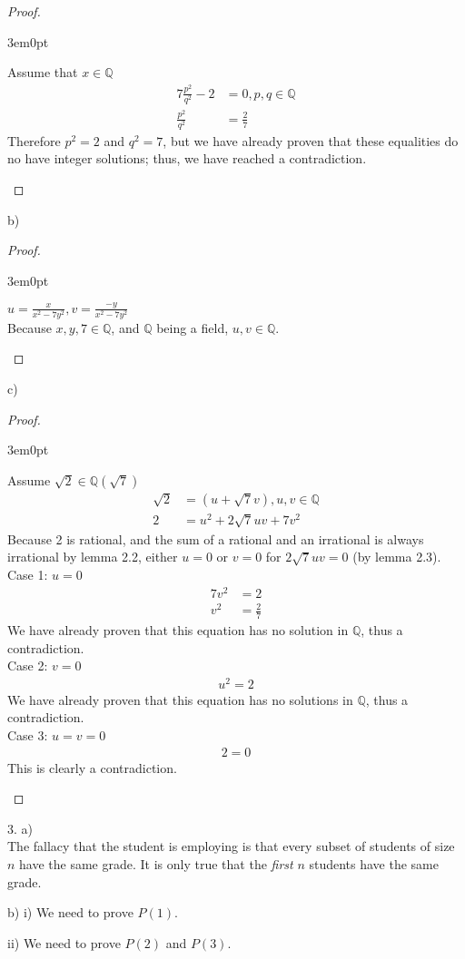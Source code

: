 \documentclass[11pt]{article}
\newcommand{\bproof}{\begin{proof}
$ $ \\
\begin{adjustwidth}{3em}{0pt}
}
\newcommand{\eproof}{\end{adjustwidth}
\end{proof}}
\begin{document}
\begin{flushleft}
\bproof
Assume that $x \in \mathbb{Q}$
\begin{align*}
7\frac{p^2}{q^2} - 2 & = 0,p,q \in \mathbb{Q} \\
\frac{p^2}{q^2} & = \frac{2}{7}
\end{align*}
Therefore $p^2 = 2$ and $q^2 = 7$, but we have already proven that these equalities do no have integer solutions; thus, we have reached a contradiction.
\eproof

\bigskip b) \bigskip

\bproof
$u = \frac{x}{x^2-7y^2}, v = \frac{-y}{x^2-7y^2}$ \\
Because $x,y,7 \in \mathbb{Q}$, and $\mathbb{Q}$ being a field, $u,v \in \mathbb{Q}$.
\eproof

\bigskip c) \bigskip

\bproof
Assume $\sqrt{2} \in \mathbb{Q}(\sqrt{7})$
\begin{align*}
\sqrt{2} & = (u + \sqrt{7}v), u,v \in \mathbb{Q} \\
2 & = u^2 + 2 \sqrt{7} uv + 7v^2
\end{align*}
Because 2 is rational, and the sum of a rational and an irrational is always irrational by lemma 2.2, either $u = 0$ or $v = 0$ for $2\sqrt{7} uv = 0 $ (by lemma 2.3).\\
Case 1: $u = 0$
\begin{align*}
7v^2 & = 2 \\
v^2 & = \frac{2}{7}
\end{align*}
We have already proven that this equation has no solution in $\mathbb{Q}$, thus a contradiction. \\
Case 2: $v = 0$
\begin{align*}
u^2 = 2
\end{align*}
We have already proven that this equation has no solutions in $\mathbb{Q}$, thus a contradiction. \\
Case 3: $u=v=0$
\begin{align*}
2 = 0
\end{align*}
This is clearly a contradiction.
\eproof

\newpage

3. a) \\ \bigskip
The fallacy that the student is employing is that every subset of students of size $n$ have the same grade. It is only true that the \emph{first} $n$ students have the same grade.

\bigskip b) i) \bigskip
We need to prove $P(1)$.

\bigskip ii) \bigskip
We need to prove $P(2)$ and $P(3)$.


\end{flushleft}
\end{document}
